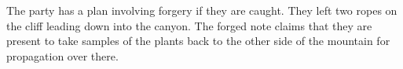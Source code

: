 The party has a plan involving forgery if they are caught.
They left two ropes on the cliff leading down into the canyon.
The forged note claims that they are present to take samples of the plants back to the other side of the mountain for propagation over there.
